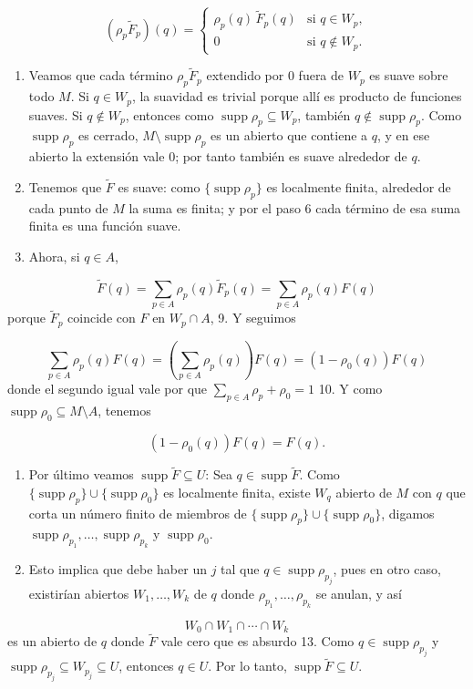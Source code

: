\begin{bookproof}{}
\[
(\rho_p\widetilde{F}_p)(q)=\begin{cases}\rho_p(q)\,\widetilde{F}_p(q)&\text{si }q\in W_p,\\0&\text{si }q\notin W_p.\end{cases}
\]
\begin{enumerate}[start=6]
\item Veamos que cada término $\rho_p\widetilde F_p$ extendido por $0$ fuera de $W_p$ es suave sobre todo $M$. Si $q\in W_p$, la suavidad es trivial porque allí es producto de funciones suaves. Si $q\notin W_p$, entonces como $\operatorname{supp}\rho_p\subseteq W_p$, también $q\notin\operatorname{supp}\rho_p$. Como $\operatorname{supp}\rho_p$ es cerrado, $M\setminus\operatorname{supp}\rho_p$ es un abierto que contiene a $q$, y en ese abierto la extensión vale $0$; por tanto también es suave alrededor de $q$.
\item Tenemos que $\widetilde{F}$ es suave: como $\{\operatorname{supp}\rho_p\}$ es localmente finita, alrededor de cada punto de $M$ la suma es finita; y por el paso 6 cada término de esa suma finita es una función suave.
\item Ahora, si $q\in A$,
\end{enumerate}
\[
\widetilde{F}(q)=\sum_{p\in A}\rho_p(q)\widetilde{F}_p(q)=\sum_{p\in A}\rho_p(q)F(q)
\]
porque $\widetilde{F}_p$ coincide con $F$ en $W_p\cap A$, 9. Y seguimos

\[
\sum_{p\in A}\rho_p(q)F(q)=\left(\sum_{p\in A}\rho_p(q)\right)F(q)=\left(1-\rho_0(q)\right)F(q)
\]
donde el segundo igual vale por que $\sum_{p\in A}\rho_{p}+\rho_{0}=1$ 10. Y como $\operatorname{supp}\rho_0\subseteq M\setminus A$, tenemos

\[
\left(1-\rho_0(q)\right)F(q)=F(q).
\]
\begin{enumerate}[start=11]
\item Por último veamos $\operatorname{supp}\widetilde{F}\subseteq U$: Sea $q\in\operatorname{supp}\widetilde{F}$. Como $\{\operatorname{supp}\rho_p\}\cup\{\operatorname{supp}\rho_0\}$ es localmente finita, existe $W_q$ abierto de $M$ con $q$ que corta un número finito de miembros de $\{\operatorname{supp}\rho_p\}\cup\{\operatorname{supp}\rho_0\}$, digamos $\operatorname{supp}\rho_{p_1},\ldots,\operatorname{supp}\rho_{p_k}$ y $\operatorname{supp}\rho_0$.
\item Esto implica que debe haber un $j$ tal que $q\in\operatorname{supp}\rho_{p_j}$, pues en otro caso, existirían abiertos $W_1,\ldots,W_k$ de $q$ donde $\rho_{p_1},\ldots,\rho_{p_k}$ se anulan, y así
\end{enumerate}
\[
W_0\cap W_1\cap\cdots\cap W_k
\]
es un abierto de $q$ donde $\widetilde{F}$ vale cero que es absurdo 13. Como $q\in\operatorname{supp}\rho_{p_j}$ y $\operatorname{supp}\rho_{p_j}\subseteq W_{p_j}\subseteq U$, entonces $q\in U$. Por lo tanto, $\operatorname{supp}\widetilde F\subseteq U$.

\bookqed
\end{bookproof}
\label{blk:b5794a}
